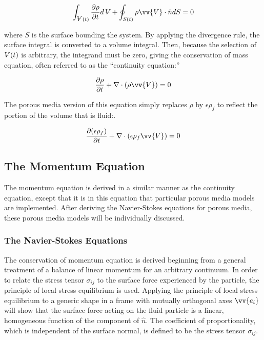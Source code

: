 \documentclass[10pt]{article}
\newcommand{\volume}{\mathop{\ooalign{\hfil$V$\hfil\cr\kern0.08em--\hfil\cr}}\nolimits}
\numberwithin{equation}{section} %
\begin{document}
\begin{equation}
\int_{\volume(t)}^{}\frac{\partial\rho}{\partial t}d\volume+\oint_{S(t)}^{}\rho\vv{V}\cdot\hat{n}dS=0
\end{equation}

where \(S\) is the surface bounding the system. By applying the divergence rule, the surface integral is converted to a volume integral. Then, because the selection of \(\volume(t)\) is arbitrary, the integrand must be zero, giving the conservation of mass equation, often referred to as the ``continuity equation:''

\begin{equation}
\label{eq:ContinuityNonPorous}
\frac{\partial\rho}{\partial t} + \nabla\cdot(\rho\vv{V})=0
\end{equation}

The porous media version of this equation simply replaces \(\rho\) by \(\epsilon\rho_f\) to reflect the portion of the volume that is fluid:.

\begin{equation}
\label{eq:ContinuityPorous1}
\begin{aligned}
\frac{\partial (\epsilon\rho_f)}{\partial t} + \nabla\cdot(\epsilon\rho_f\vv{V})=0\\
\end{aligned}
\end{equation}

\subsection{The Momentum Equation}

The momentum equation is derived in a similar manner as the continuity equation, except that it is in this equation that particular porous media models are implemented. After deriving the Navier-Stokes equations for porous media, these porous media models will be individually discussed.

\subsubsection{The Navier-Stokes Equations}
\label{sec:NS}

The conservation of momentum equation is derived beginning from a general treatment of a balance of linear momentum for an arbitrary continuum. In order to relate the stress tensor \(\sigma_{ij}\) to the surface force experienced by the particle, the principle of local stress equilibrium is used. Applying the principle of local stress equilibrium to a generic shape in a frame with mutually orthogonal axes \(\vv{e_i}\) will show that the surface force acting on the fluid particle is a linear, homogeneous function of the component of \(\hat{n}\). The coefficient of proportionality, which is independent of the surface normal, is defined to be the stress tensor \(\sigma_{ij}\). 
\end{document}
